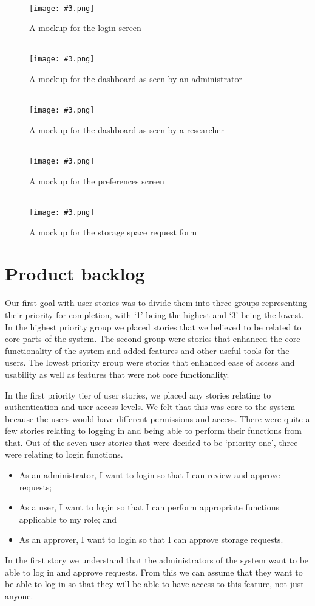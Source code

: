 \documentclass[a4paper,titlepage,12pt]{article}
\let\stdsection\section
\renewcommand\section{\newpage\stdsection}
\newcommand\figimg[4][\textwidth]{
	\begin{figure}
		\caption{#4}
		\label{fig:#2}
		\quad\\\texttt{[image: \#3.png]}
	\end{figure}
}
\begin{document}
\figimg{login-mockup}{../mockups/login}
	{A mockup for the login screen}

\figimg{admin-mockup}{../mockups/admin}
	{A mockup for the dashboard as seen by an administrator}

\figimg{researcher-mockup}{../mockups/researcher}
	{A mockup for the dashboard as seen by a researcher}

\figimg{preferences-mockup}{../mockups/preferences}
	{A mockup for the preferences screen}

\figimg{request-mockup}{../mockups/request}
	{A mockup for the storage space request form}

\section{Product backlog}

Our first goal with user stories was to divide them into three groups
representing their priority for completion, with `1' being the highest and `3'
being the lowest. In the highest priority group we placed stories that we
believed to be related to core parts of the system. The second group were
stories that enhanced the core functionality of the system and added features
and other useful tools for the users. The lowest priority group were stories
that enhanced ease of access and usability as well as features that were not
core functionality.

In the first priority tier of user stories, we placed any stories relating to
authentication and user access levels. We felt that this was core to the system
because the users would have different permissions and access. There were quite
a few stories relating to logging in and being able to perform their functions
from that. Out of the seven user stories that were decided to be `priority
one', three were relating to login functions.

\begin{itemize}
	\item As an administrator, I want to login so that I can review and
	      approve requests;
	\item As a user, I want to login so that I can perform appropriate
	      functions applicable to my role; and
	\item As an approver, I want to login so that I can approve storage
	      requests.
\end{itemize}

In the first story we understand that the administrators of the system want to
be able to log in and approve requests. From this we can assume that they want
to be able to log in so that they will be able to have access to this feature,
not just anyone.
\end{document}
